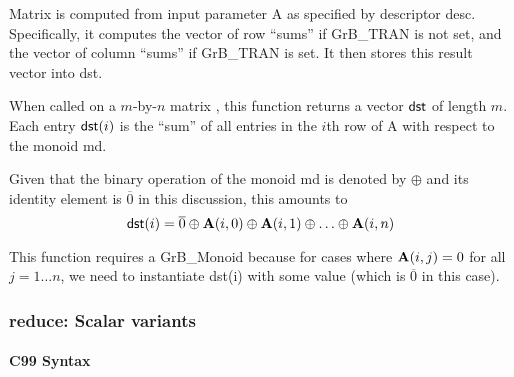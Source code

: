 Matrix  is computed from
input parameter {\sf A} as specified
by descriptor {\sf desc}. Specifically, it computes the vector of row ``sums'' if GrB\_TRAN is not set, and
the vector of column ``sums'' if GrB\_TRAN  is set. It then stores this result vector into {\sf dst}. 

When called on a $m$-by-$n$ matrix , this function returns a vector ${\sf dst}$ of length $m$. Each entry
${\sf dst}(i)$ is the ``sum'' of all entries in the $i$th row of {\sf A} with respect to the monoid {\sf md}. 

Given that the binary operation of the monoid {\sf md} is denoted by $\oplus$ and its identity element is $\overline{0}$ in this discussion, 
this amounts to $$ {\sf dst}(i) = \overline{0} \oplus {\bf A}(i,0) \oplus {\bf A}(i,1) \oplus  \ldots \oplus  {\bf A}(i,n) $$

This function requires a GrB\_Monoid because for cases where ${\bf A}(i,j) = 0$ for all $j=1 \ldots n$, we need to instantiate {\sf dst}(i) with some value (which
is $\overline{0}$ in this case).




\subsubsection{{\sf reduce}: Scalar variants}





\paragraph{C99 Syntax}

